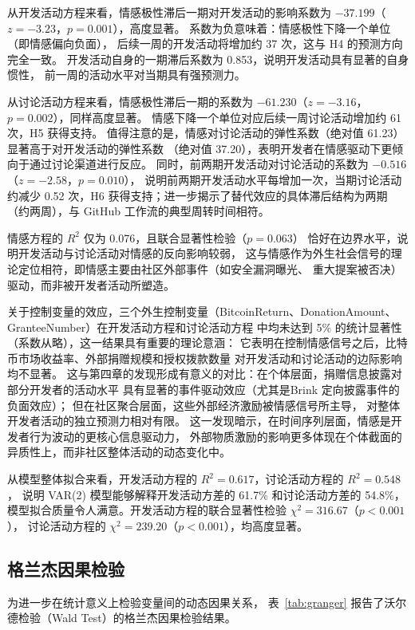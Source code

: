 \documentclass[
    type = master, %
    degree = professional,        %
    decl-page,  %
    twoside,                %
    fontset = fandol %
  ]{njuthesis}
\begin{document}
从开发活动方程来看，情感极性滞后一期对开发活动的影响系数为
$-37.199$（$z = -3.23$，$p = 0.001$），高度显著。
系数为负意味着：情感极性下降一个单位（即情感偏向负面），
后续一周的开发活动将增加约 37 次，这与 H4 的预测方向完全一致。
开发活动自身的一期滞后系数为 0.853，说明开发活动具有显著的自身惯性，
前一周的活动水平对当期具有强预测力。

从讨论活动方程来看，情感极性滞后一期的系数为
$-61.230$（$z = -3.16$，$p = 0.002$），同样高度显著。
情感下降一个单位对应后续一周讨论活动增加约 61 次，H5 获得支持。
值得注意的是，情感对讨论活动的弹性系数（绝对值 61.23）显著高于对开发活动的弹性系数
（绝对值 37.20），表明开发者在情感驱动下更倾向于通过讨论渠道进行反应。
同时，前两期开发活动对讨论活动的系数为
$-0.516$（$z = -2.58$，$p = 0.010$），
说明前两期开发活动水平每增加一次，当期讨论活动约减少 0.52 次，H6 获得支持；进一步揭示了替代效应的具体滞后结构为两期（约两周），与 GitHub 工作流的典型周转时间相符。

情感方程的 $R^2$ 仅为 0.076，且联合显著性检验（$p = 0.063$）
恰好在边界水平，说明开发活动与讨论活动对情感的反向影响较弱，
这与情感作为外生社会信号的理论定位相符，即情感主要由社区外部事件（如安全漏洞曝光、
重大提案被否决）驱动，而非被开发者活动所塑造。

关于控制变量的效应，三个外生控制变量（BitcoinReturn、DonationAmount、GranteeNumber）在开发活动方程和讨论活动方程
中均未达到 5\% 的统计显著性（系数从略），这一结果具有重要的理论意涵：
它表明在控制情感信号之后，比特币市场收益率、外部捐赠规模和授权拨款数量
对开发活动和讨论活动的边际影响均不显著。
这与第四章的发现形成有意义的对比：在个体层面，捐赠信息披露对部分开发者的活动水平
具有显著的事件驱动效应（尤其是Brink 定向披露事件的负面效应）；
但在社区聚合层面，这些外部经济激励被情感信号所主导，
对整体开发者活动的独立预测力相对有限。
这一发现暗示，在时间序列层面，情感是开发者行为波动的更核心信息驱动力，
外部物质激励的影响更多体现在个体截面的异质性上，而非社区整体活动的动态变化中。

从模型整体拟合来看，开发活动方程的 $R^2 = 0.617$，讨论活动方程的 $R^2 = 0.548$，
说明 VAR(2) 模型能够解释开发活动方差的 61.7\% 和讨论活动方差的 54.8\%，
模型拟合质量令人满意。开发活动方程的联合显著性检验 $\chi^2 = 316.67$（$p < 0.001$），
讨论活动方程的 $\chi^2 = 239.20$（$p < 0.001$），均高度显著。

\subsection{格兰杰因果检验}

为进一步在统计意义上检验变量间的动态因果关系，
表~\ref{tab:granger} 报告了沃尔德检验（Wald Test）的格兰杰因果检验结果。
\end{document}
